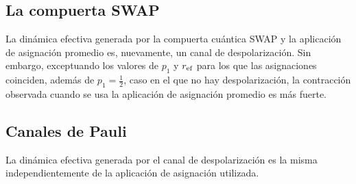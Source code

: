 \subsection{La compuerta SWAP}

La dinámica efectiva generada por la compuerta cuántica SWAP y la aplicación de asignación promedio es, nuevamente, un canal de despolarización. Sin embargo, exceptuando los valores de $p_{1}$ y $r_{\text{ef}}$ para los que las asignaciones coinciden, además de $p_{1}=\frac{1}{2}$, caso en el que no hay despolarización, la contracción observada cuando se usa la aplicación de asignación promedio es más fuerte.


\subsection{Canales de Pauli}

La dinámica efectiva generada por el canal de despolarización es la misma independientemente de la aplicación de asignación utilizada.

